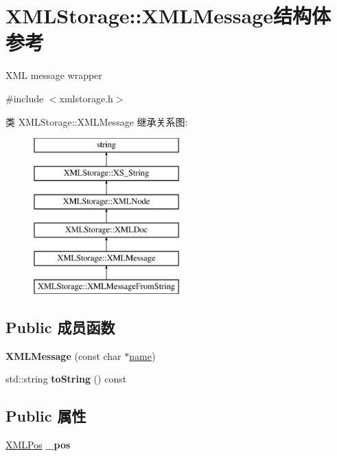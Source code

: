 \hypertarget{struct_x_m_l_storage_1_1_x_m_l_message}{}\section{X\+M\+L\+Storage\+:\+:X\+M\+L\+Message结构体 参考}
\label{struct_x_m_l_storage_1_1_x_m_l_message}


X\+ML message wrapper  




{\ttfamily \#include $<$xmlstorage.\+h$>$}

类 X\+M\+L\+Storage\+:\+:X\+M\+L\+Message 继承关系图\+:\begin{figure}[H]
\begin{center}
\leavevmode
\includegraphics[height=6.000000cm]{struct_x_m_l_storage_1_1_x_m_l_message}
\end{center}
\end{figure}
\subsection*{Public 成员函数}
\begin{DoxyCompactItemize}
\item 
\mbox{\label{struct_x_m_l_storage_1_1_x_m_l_message_a767d267bab5433d394ff82ddf1bc124d}} 
{\bfseries X\+M\+L\+Message} (const char $\ast$\hyperlink{structname}{name})
\item 
\mbox{\label{struct_x_m_l_storage_1_1_x_m_l_message_a18c9ee4d40c758d8a4d3d1f8f088acb1}} 
std\+::string {\bfseries to\+String} () const
\end{DoxyCompactItemize}
\subsection*{Public 属性}
\begin{DoxyCompactItemize}
\item 
\mbox{\label{struct_x_m_l_storage_1_1_x_m_l_message_a9aeb9c696834b77e44eedeaabfa031bf}} 
\hyperlink{struct_x_m_l_storage_1_1_x_m_l_pos}{X\+M\+L\+Pos} {\bfseries \+\_\+pos}
\end{DoxyCompactItemize}
